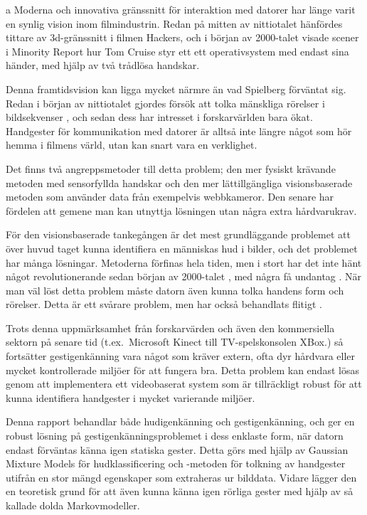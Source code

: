 \documentclass[../rapport_MVEX01-11-05]{subfiles}
\begin{document}
	a
Moderna och innovativa gränssnitt för interaktion med datorer har länge varit
en synlig vision inom filmindustrin. Redan på mitten av nittiotalet hänfördes
tittare av 3d-gränssnitt i filmen Hackers, och i början av 2000-talet visade
scener i Minority Report hur Tom Cruise styr ett ett operativsystem med endast
sina händer, med hjälp av två trådlösa handskar.

Denna framtidsvision kan
ligga mycket närmre än vad Spielberg förväntat sig. Redan i början av
nittiotalet gjordes försök att tolka mänskliga rörelser i bildsekvenser
\cite{Yamato92}, och sedan dess har intresset i forskarvärlden bara ökat.
Handgester för kommunikation med datorer är alltså inte längre något som
hör hemma i filmens värld, utan kan snart vara en verklighet.

Det finns två angreppsmetoder till detta problem; den mer fysiskt krävande
metoden med sensorfyllda handskar och den mer lättillgängliga visionsbaserade
metoden som använder data från exempelvis webbkameror. Den senare har
fördelen att gemene man kan utnyttja lösningen utan några extra hårdvarukrav.

För den visionsbaserade tankegången är det mest grundläggande problemet att över huvud taget kunna identifiera en människas hud i bilder, och det
problemet har många lösningar. Metoderna förfinas hela tiden, men i stort har
det inte hänt något revolutionerande sedan början av 2000-talet
\cite{Sebe04,Kruppa02,Albiol01,Brand00}, med några få undantag
. När man väl löst detta problem måste datorn
även kunna tolka handens form och rörelser. Detta är ett svårare problem, men
har också behandlats flitigt \cite{Pavlovic97,Garg09,Nielsen04,Zabulis09}.

Trots denna uppmärksamhet från forskarvärden och även den kommersiella sektorn
på senare tid (t.ex.~Microsoft Kinect till TV-spelskonsolen XBox.) så fortsätter gestigenkänning vara något som
kräver extern, ofta dyr hårdvara eller mycket kontrollerade miljöer för att
fungera bra. Detta problem kan endast lösas genom att implementera ett
videobaserat system som är tillräckligt robust för att kunna identifiera
handgester i mycket varierande miljöer.

Denna rapport behandlar både hudigenkänning och gestigenkänning, och ger en
robust lösning på gestigenkänningsproblemet i dess enklaste form, när
datorn endast förväntas känna igen statiska gester. Detta görs med hjälp av
Gaussian Mixture Models för hudklassificering och \knn-metoden för tolkning
av handgester utifrån en stor mängd egenskaper som extraheras ur bilddata.
Vidare lägger den en
teoretisk grund för att även kunna känna igen rörliga gester med hjälp av
så kallade dolda Markovmodeller.
\end{document}
